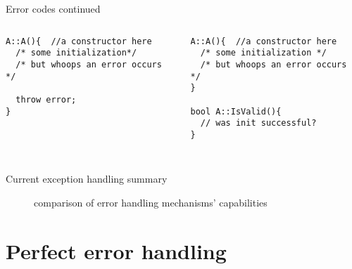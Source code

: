 \documentclass[10pt,a4paper]{beamer}
\begin{document}
\begin{frame}[fragile]{Error codes continued}

	\begin{columns}
		\begin{column}{0.48\linewidth}
			\begin{verbatim}
A::A(){  //a constructor here
  /* some initialization*/
  /* but whoops an error occurs */

  throw error; 
}
			\end{verbatim}
		\end{column}
	\pause
		\begin{column}{0.48\linewidth}
			\begin{verbatim}
A::A(){  //a constructor here
  /* some initialization */
  /* but whoops an error occurs */
}	

bool A::IsValid(){ 
  // was init successful?
} 
	
			\end{verbatim}
		\end{column}
	\end{columns}
\end{frame}
	
\begin{frame}{Current exception handling summary}
	\centering

	\begin{figure}
	
		\caption{comparison of error handling mechanisms' capabilities}	
	\end{figure}
	

\end{frame}
	
\section{Perfect error handling}
\end{document}
